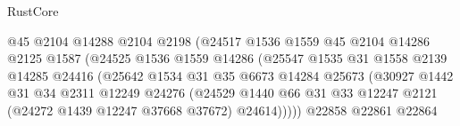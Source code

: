 \begin{lexlean}{RustCore}
\begin{coremodule}
                                        @45
                                        @2104
                                        @14288
                                        @2104
                                        @2198
                                        (@24517
                                          @1536
                                          @1559
                                          @45
                                          @2104
                                          @14286
                                          @2125
                                          @1587
                                          (@24525
                                            @1536
                                            @1559
                                            @14286
                                            (@25547
                                              @1535
                                              @31
                                              @1558
                                              @2139
                                              @14285
                                              @24416
                                              (@25642
                                                @1534
                                                @31
                                                @35
                                                @6673
                                                @14284
                                                @25673
                                                (@30927
                                                  @1442
                                                  @31
                                                  @34
                                                  @2311
                                                  @12249
                                                  @24276
                                                  (@24529
                                                    @1440
                                                    @66
                                                    @31
                                                    @33
                                                    @12247
                                                    @2121
                                                    (@24272 @1439 @12247 @37668 @37672)
                                                    @24614)))))
                                          @22858
                                          @22861
                                          @22864

\end{coremodule}
\end{lexlean}
